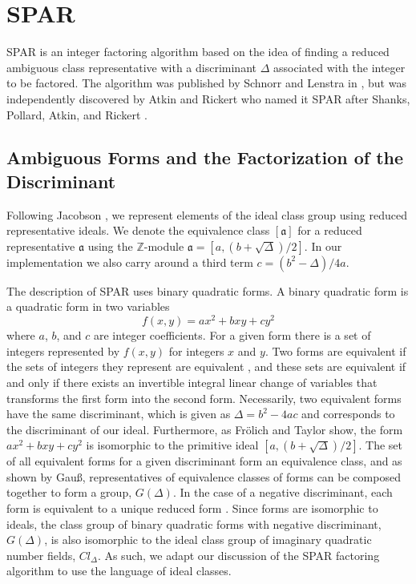 \documentclass{ucalgthes1}
\theoremstyle{definition}
\newcommand{\ZZ}{\mathbb{Z}}
\begin{document}
\section{SPAR}
\label{sec:spar}

SPAR is an integer factoring algorithm based on the idea of finding a reduced ambiguous class representative with a discriminant $\Delta$ associated with the integer to be factored.  The algorithm was published by Schnorr and Lenstra in \cite{Schnorr1984}, but was independently discovered by Atkin and Rickert who named it SPAR after Shanks, Pollard, Atkin, and Rickert \cite[p.182]{Jacobson1999}.

\subsection{Ambiguous Forms and the Factorization of the Discriminant}
\label{subsec:forms}

Following Jacobson \cite{Jacobson1999}, we represent elements of the ideal class group using reduced representative ideals.  We denote the equivalence class $[\mathfrak a]$ for a reduced representative $\mathfrak a$ using the $\ZZ$\mbox{-}module $\mathfrak a = [a, (b + \sqrt\Delta)/2]$. In our implementation we also carry around a third term $c = (b^2 - \Delta)/4a$.

The description of SPAR uses binary quadratic forms. A binary quadratic form is a quadratic form in two variables
\[
	f(x, y) = ax^2 + bxy + cy^2
\]
where $a$, $b$, and $c$ are integer coefficients.  For a given form there is a set of integers represented by $f(x, y)$ for integers $x$ and $y$. Two forms are equivalent if the sets of integers they represent are equivalent \cite[pp.239-240]{Crandall2001}, and these sets are equivalent if and only if there exists an invertible integral linear change of variables that transforms the first form into the second form. Necessarily, two equivalent forms have the same discriminant, which is given as $\Delta = b^2 - 4ac$ and corresponds to the discriminant of our ideal.  Furthermore, as Fr\"olich and Taylor \cite{Frolich1993} show, the form $ax^2 + bxy + cy^2$ is isomorphic to the primitive ideal $[a, (b + \sqrt\Delta)/2]$.  The set of all equivalent forms for a given discriminant form an equivalence class, and as shown by Gau\ss, representatives of equivalence classes of forms can be composed together to form a group, $G(\Delta)$.  In the case of a negative discriminant, each form is equivalent to a unique reduced form \cite[p.241]{Crandall2001}.  Since forms are isomorphic to ideals, the class group of binary quadratic forms with negative discriminant, $G(\Delta)$, is also isomorphic to the ideal class group of imaginary quadratic number fields, $Cl_\Delta$. As such, we adapt our discussion of the SPAR factoring algorithm to use the language of ideal classes.
\end{document}
